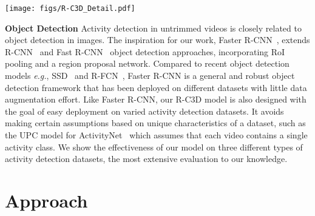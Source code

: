 \documentclass[10pt,twocolumn,letterpaper]{article}
\newcommand{\modelname}[0]{R-C3D }
\begin{document}
\begin{figure*}[ht]
\begin{center}
\texttt{[image: figs/R-C3D\_Detail.pdf]}\end{center}
\vskip -0.15in
\caption{\modelname model architecture.
The 3D ConvNet takes raw video frames as input and computes convolutional features.
These are input to the Proposal Subnet that proposes candidate activities of variable length along with confidence scores.
The Classification Subnet filters the proposals, pools fixed size features and then predicts activity labels along with refined segment boundaries.}
\label{fig:architecture}
\end{figure*}

\textbf{Object Detection}
Activity detection in untrimmed videos is closely related to object detection in images.
The inspiration for our work, Faster R-CNN~\cite{ren2015faster}, extends R-CNN~\cite{girshick2014rich} and Fast R-CNN~\cite{girshick2015fast} object detection approaches, incorporating RoI pooling and a region proposal network.
Compared to recent object detection models \textit{e.g.}, SSD~\cite{liu2016ssd} and R-FCN~\cite{li2016r}, Faster R-CNN is a general and robust object detection framework that has been deployed on different datasets with little data augmentation effort. 
Like Faster R-CNN, our \modelname model is also designed with the goal of easy deployment on varied activity detection datasets.
It avoids making certain assumptions based on unique characteristics of a dataset, such as the UPC model for ActivityNet~\cite{montes2016temporal} which assumes that each video contains a single activity class.
We show the effectiveness of our model on three different types of activity detection datasets, the most extensive evaluation to our knowledge.
 \section{Approach}
\label{sec:approach}
\end{document}
